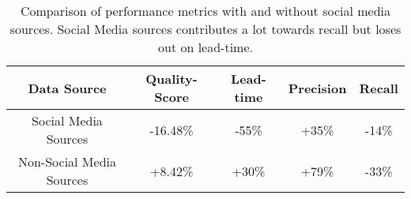 \begin{table}
\caption{Comparison of performance metrics with and without social media sources. Social Media sources contributes a lot towards recall but loses out on
lead-time.}
\label{tb:ablation_twitter}
\begin{tabular}{|c|c|c|c|c|}
\hline
Data Source          & Quality-Score & Lead-time & Precision & Recall \\
\hline
Social Media Sources & \cellcolor{red!16} -16.48\% & \cellcolor{red!55} -55\% & \cellcolor{green!35} +35\% & \cellcolor{red!14} -14\% \\
\hline
Non-Social Media Sources & \cellcolor{green!10} +8.42\% & \cellcolor{green!40} +30\%  & \cellcolor{green!60} +79\% & \cellcolor{red!30} -33\% \\
\hline
\end{tabular}
\end{table}
